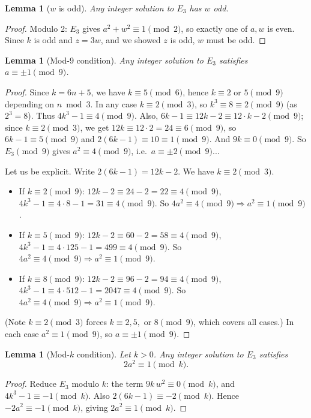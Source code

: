 \documentclass[12pt]{article}
\newtheorem{lemma}[theorem]{Lemma}
\begin{document}
\begin{lemma}[$w$ is odd]\label{lem:wodd}
Any integer solution to $E_3$ has $w$ odd.
\end{lemma}
\begin{proof}
Modulo 2: $E_3$ gives $a^2 + w^2 \equiv 1 \pmod 2$, so exactly one of $a, w$ is even.
Since $k$ is odd and $z = 3w$, and we showed $z$ is odd, $w$ must be odd.
\end{proof}

\begin{lemma}[Mod-9 condition]\label{lem:mod9}
Any integer solution to $E_3$ satisfies $a \equiv \pm 1 \pmod{9}$.
\end{lemma}
\begin{proof}
Since $k = 6n+5$, we have $k \equiv 5 \pmod 6$, hence $k \equiv 2$ or $5 \pmod 9$ depending on $n \bmod 3$. 
In any case $k \equiv 2 \pmod 3$, so $k^3 \equiv 8 \equiv 2 \pmod 9$ (as $2^3=8$).
Thus $4k^3 - 1 \equiv 4 \pmod 9$.
Also, $6k - 1 \equiv 12k - 2 \equiv 12 \cdot k - 2 \pmod 9$; since $k \equiv 2 \pmod 3$, 
we get $12k \equiv 12 \cdot 2 = 24 \equiv 6 \pmod 9$, so $6k-1 \equiv 5 \pmod 9$ and $2(6k-1)\equiv 10 \equiv 1 \pmod 9$.
And $9k \equiv 0 \pmod 9$.
So $E_3 \pmod 9$ gives $a^2 \equiv 4 \pmod 9$, i.e.\ $a \equiv \pm 2 \pmod 9$... 

\medskip
\noindent
Let us be explicit. Write $2(6k-1) = 12k-2$. We have $k \equiv 2 \pmod 3$.
\begin{itemize}
\item If $k \equiv 2 \pmod 9$: $12k-2 \equiv 24-2=22\equiv 4 \pmod 9$, $4k^3-1\equiv 4\cdot 8-1=31\equiv 4\pmod 9$.
      So $4a^2 \equiv 4 \pmod 9 \Rightarrow a^2 \equiv 1 \pmod 9$.
\item If $k \equiv 5 \pmod 9$: $12k-2 \equiv 60-2=58\equiv 4 \pmod 9$, $4k^3-1\equiv 4\cdot 125-1=499\equiv 4\pmod 9$.
      So $4a^2 \equiv 4 \pmod 9 \Rightarrow a^2 \equiv 1 \pmod 9$.
\item If $k \equiv 8 \pmod 9$: $12k-2 \equiv 96-2=94\equiv 4 \pmod 9$, $4k^3-1\equiv 4\cdot 512-1=2047\equiv 4\pmod 9$.
      So $4a^2 \equiv 4 \pmod 9 \Rightarrow a^2 \equiv 1 \pmod 9$.
\end{itemize}
(Note $k \equiv 2 \pmod 3$ forces $k \equiv 2, 5, $ or $8 \pmod 9$, which covers all cases.)
In each case $a^2 \equiv 1 \pmod 9$, so $a \equiv \pm 1 \pmod 9$.
\end{proof}

\begin{lemma}[Mod-$k$ condition]\label{lem:modk}
Let $k > 0$. Any integer solution to $E_3$ satisfies
\begin{equation}\label{eq:modk}
2a^2 \equiv 1 \pmod{k}.
\end{equation}
\end{lemma}
\begin{proof}
Reduce $E_3$ modulo $k$: the term $9k\,w^2 \equiv 0 \pmod k$, and $4k^3 - 1 \equiv -1 \pmod k$.
Also $2(6k-1) \equiv -2 \pmod k$. Hence $-2a^2 \equiv -1 \pmod k$, giving $2a^2 \equiv 1 \pmod k$.
\end{proof}
\end{document}
